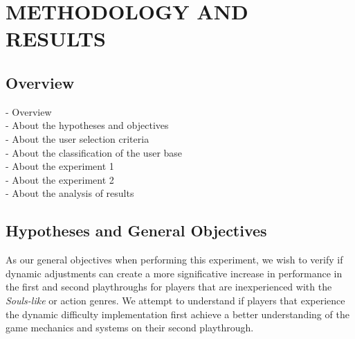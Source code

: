 \chapter{METHODOLOGY AND RESULTS}
\label{ch:methodology-results}

\section{Overview}

- Overview \\
- About the hypotheses and objectives \\
- About the user selection criteria \\
- About the classification of the user base \\
- About the experiment 1 \\
- About the experiment 2 \\
- About the analysis of results 


\section{Hypotheses and General Objectives}


As our general objectives when performing this experiment, we wish to verify if dynamic adjustments can create a more significative increase in performance in the first and second playthroughs for players that are inexperienced with the \emph{Souls-like} or action genres. We attempt to understand if players that experience the dynamic difficulty implementation first achieve a better understanding of the game mechanics and systems on their second playthrough.


